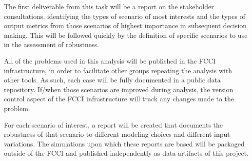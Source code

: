 The first deliverable from this task will be a report on the stakeholder
consultations, identifying the types of scenario of most interests and the
types of output metrics from those scenarios of highest importance in
subsequent decision making.  This will be followed quickly by the definition
of specific scenarios to use in the assessment of robustness.

All of the problems used in this analysis will be published in the \gls{FCCI}
infrastructure, in order to facilitate other groups repeating the analysis
with other tools.  As such, each case will be fully documented in a public
data repository.  If/when those scenarios are improved during analysis, the
version control aspect of the \gls{FCCI} infrastructure will track any changes
made to the problem.

For each scenario of interest, a report will be created that documents the
robustness of that scenario to different modeling choices and different input
variations.  The simulations upon which these reports are based will be
packaged outside of the \gls{FCCI} and published independently as data
artifacts of this project.
